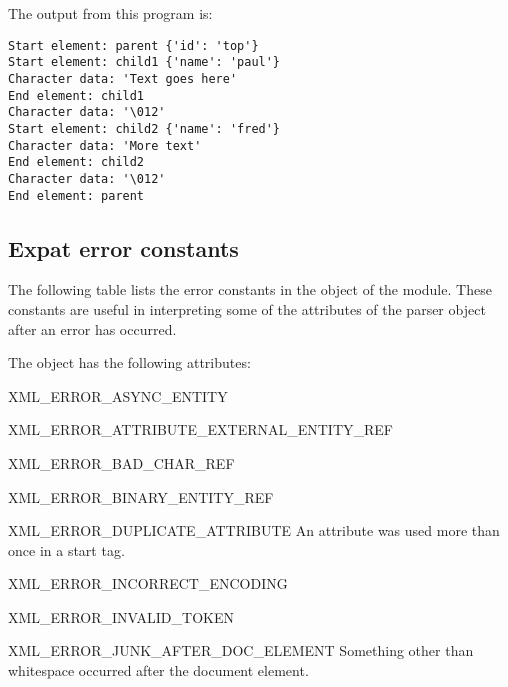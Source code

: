 The output from this program is:

\begin{verbatim}
Start element: parent {'id': 'top'}
Start element: child1 {'name': 'paul'}
Character data: 'Text goes here'
End element: child1
Character data: '\012'
Start element: child2 {'name': 'fred'}
Character data: 'More text'
End element: child2
Character data: '\012'
End element: parent
\end{verbatim}


\subsection{Expat error constants \label{expat-errors}}

The following table lists the error constants in the
 object of the  module.  These
constants are useful in interpreting some of the attributes of the
parser object after an error has occurred.

The  object has the following attributes:

\begin{datadesc}{XML_ERROR_ASYNC_ENTITY}
\end{datadesc}

\begin{datadesc}{XML_ERROR_ATTRIBUTE_EXTERNAL_ENTITY_REF}
\end{datadesc}

\begin{datadesc}{XML_ERROR_BAD_CHAR_REF}
\end{datadesc}

\begin{datadesc}{XML_ERROR_BINARY_ENTITY_REF}
\end{datadesc}

\begin{datadesc}{XML_ERROR_DUPLICATE_ATTRIBUTE}
An attribute was used more than once in a start tag.
\end{datadesc}

\begin{datadesc}{XML_ERROR_INCORRECT_ENCODING}
\end{datadesc}

\begin{datadesc}{XML_ERROR_INVALID_TOKEN}
\end{datadesc}

\begin{datadesc}{XML_ERROR_JUNK_AFTER_DOC_ELEMENT}
Something other than whitespace occurred after the document element.
\end{datadesc}

